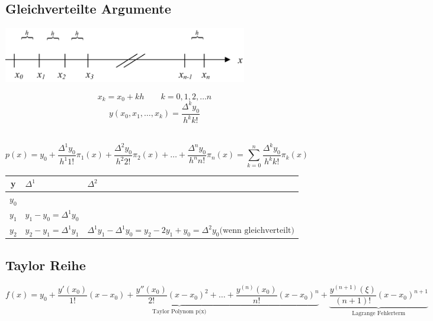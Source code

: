 \subsection{Gleichverteilte Argumente}

\begin{minipage}[c]{11.0cm}
	\includegraphics[width=0.8\textwidth]{bilder/gleichvArgum.png}	
\end{minipage}
\begin{minipage}[c]{6.0cm}
	$$x_k=x_0+k h\qquad k=0,1,2,\ldots n$$
	$$\boxed{y(x_0,x_1,\ldots,x_k)=\frac{\Delta^k y_0}{h^k k!}}$$
\end{minipage}
\hfill\\

$$p(x)=y_0+\frac{\Delta^1 y_0}{h^1 1!}\pi_1(x)+\frac{\Delta^2 y_0}{h^2 2!}\pi_2(x)+\ldots+\frac{\Delta^n y_0}{h^n n!}\pi_n(x)=\sum\limits_{k=0}^{n}{\frac{\Delta^k y_0}{h^k k!}\pi_k(x)}$$

\begin{tabular}{|c|l|l|}
\hline
y		& $\Delta^1$	& $\Delta^2$\\
\hline
$y_0$	&&\\
$y_1$	& $y_1-y_0=\Delta^1y_0$&\\
$y_2$	& $y_2-y_1=\Delta^1y_1$	& $\Delta^1 y_1 - \Delta^1 y_0 = y_2 - 2y_1 +y_0=\Delta^2y_0 \text{(wenn gleichverteilt)}$\\
\hline
\end{tabular}

\subsection{Taylor Reihe}
$$f(x)=\underset{\text{Taylor Polynom p(x)}}{\underbrace{y_0+\frac{y'(x_0)}{1!}(x-x_0)+\frac{y''(x_0)}{2!}(x-x_0)^2+\ldots+\frac{y^{(n)}(x_0)}{n!}(x-x_0)^n}}+\underset{\text{Lagrange Fehlerterm}}{\underbrace{\frac{y^{(n+1)}(\xi)}{(n+1)!}(x-x_0)^{n+1}}}$$
